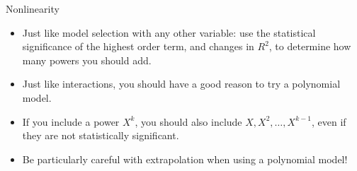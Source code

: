 \documentclass{beamer}\usepackage[]{graphicx}\usepackage[]{color}
\makeatletter
\newcommand{\hlnum}[1]{\textcolor[rgb]{0.824,0.412,0.118}{#1}}%
\newcommand{\hlopt}[1]{\textcolor[rgb]{1,0.894,0.769}{#1}}%
\newcommand{\hlstd}[1]{\textcolor[rgb]{1,0.894,0.769}{#1}}%
\newcommand{\hlkwb}[1]{\textcolor[rgb]{0.804,0.776,0.451}{#1}}%
\newcommand{\hlkwc}[1]{\textcolor[rgb]{0.78,0.941,0.545}{#1}}%
\newcommand{\hlkwd}[1]{\textcolor[rgb]{1,0.78,0.769}{#1}}%
\newenvironment{kframe}{%
 \def\at@end@of@kframe{}%
 \ifinner\ifhmode%
  \def\at@end@of@kframe{\end{minipage}}%
  \begin{minipage}{\columnwidth}%
 \fi\fi%
 \def\FrameCommand##1{\hskip\@totalleftmargin \hskip-\fboxsep
 \colorbox{shadecolor}{##1}\hskip-\fboxsep
     \hskip-\linewidth \hskip-\@totalleftmargin \hskip\columnwidth}%
 \MakeFramed {\advance\hsize-\width
   \@totalleftmargin\z@ \linewidth\hsize
   \@setminipage}}%
 {\par\unskip\endMakeFramed%
 \at@end@of@kframe}
\newenvironment{knitrout}{}{} %
\makeatother
\begin{document}
\begin{darkframes}
\begin{frame}[fragile]
\begin{knitrout}
\end{knitrout}
    \end{frame}


    \begin{frame}{Nonlinearity}
      \begin{itemize}
        \item Just like model selection with any other variable: use the statistical significance of the highest order term, and changes in $R^2$, to determine how many powers you should add.
        \item Just like interactions, you should have a good reason to try a polynomial model.
        \item If you include a power $X^k$, you should also include $X, X^2, \ldots, X^{k-1}$, even if they are not statistically significant.
        \item Be particularly careful with extrapolation when using a polynomial model!
      \end{itemize}
    \end{frame}

  \end{darkframes}

  
\end{document}
